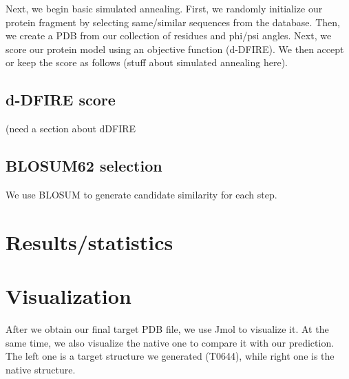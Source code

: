 \documentclass{article}
\begin{document}
Next, we begin basic simulated annealing.  First, we randomly initialize our protein fragment by selecting same/similar sequences from the database.  Then, we create a PDB from our collection of residues and phi/psi angles.  Next, we score our protein model using an objective function (d-DFIRE).  We then accept or keep the score as follows (stuff about simulated annealing here).


\subsection{d-DFIRE score}

(need a section about dDFIRE

\subsection{BLOSUM62 selection}

We use BLOSUM to generate candidate similarity for each step.

\section{Results/statistics}


\newpage
\section{Visualization}

After we obtain our final target PDB file, we use Jmol to visualize it. At the same time, we also visualize the native one to compare it with our prediction.  The left one is a target structure we generated (T0644), while right one is the native structure.
\end{document}
